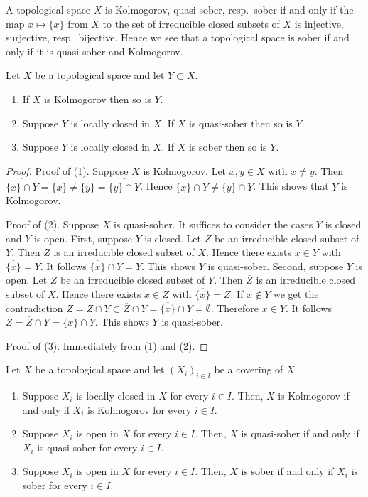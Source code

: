 \noindent
A topological space $X$ is Kolmogorov, quasi-sober, resp.\ sober if and
only if the map $x\mapsto\overline{\{x\}}$ from $X$ to the set of
irreducible closed subsets of $X$ is injective, surjective, resp.\ bijective.
Hence we see that a topological space is sober if and only if it is
quasi-sober and Kolmogorov.

\begin{lemma}
\label{lemma-sober-subspace}
Let $X$ be a topological space and let $Y\subset X$.
\begin{enumerate}
\item If $X$ is Kolmogorov then so is $Y$.
\item Suppose $Y$ is locally closed in $X$. If $X$ is quasi-sober then
so is $Y$.
\item Suppose $Y$ is locally closed in $X$. If $X$ is sober then so is $Y$.
\end{enumerate}
\end{lemma}

\begin{proof}
Proof of (1). Suppose $X$ is Kolmogorov. Let $x,y\in X$ with $x\neq y$. Then
$\overline{\overline{\{x\}}\cap Y}=\overline{\{x\}}\neq\overline{\{y\}}=
\overline{\overline{\{y\}}\cap Y}$. Hence
$\overline{\{x\}}\cap Y\neq\overline{\{y\}}\cap Y$. This shows that $Y$ is
Kolmogorov.

\medskip\noindent
Proof of (2). Suppose $X$ is quasi-sober. It suffices to consider the
cases $Y$ is closed and $Y$ is open. First, suppose $Y$ is closed. Let
$Z$ be an irreducible closed subset of $Y$. Then $Z$ is an irreducible closed
subset of $X$. Hence there exists $x\in Y$ with $\overline{\{x\}}=Y$. It
follows $\overline{\{x\}}\cap Y=Y$. This shows $Y$ is quasi-sober. Second,
suppose $Y$ is open. Let $Z$ be an irreducible closed subset of $Y$. Then
$\overline{Z}$ is an irreducible closed subset of $X$. Hence there
exists $x\in Z$ with $\overline{\{x\}}=\overline{Z}$. If
$x\notin Y$ we get the contradiction
$Z=Z\cap Y\subset\overline{Z}\cap Y=\overline{\{x\}}\cap Y=\emptyset$.
Therefore $x\in Y$. It follows $Z=\overline{Z}\cap Y=\overline{\{x\}}\cap Y$.
This shows $Y$ is quasi-sober.

\medskip\noindent
Proof of (3). Immediately from (1) and (2).
\end{proof}

\begin{lemma}
\label{lemma-sober-local}
Let $X$ be a topological space and let $(X_i)_{i\in I}$ be a covering of $X$.
\begin{enumerate}
\item Suppose $X_i$ is locally closed in $X$ for every $i\in I$. Then, $X$ is
Kolmogorov if and only if $X_i$ is Kolmogorov for every $i\in I$.
\item Suppose $X_i$ is open in $X$ for every $i\in I$. Then, $X$ is
quasi-sober if and only if $X_i$ is quasi-sober for every $i\in I$.
\item Suppose $X_i$ is open in $X$ for every $i\in I$. Then, $X$ is sober if
and  only if $X_i$ is sober for every $i\in I$.
\end{enumerate}
\end{lemma}

